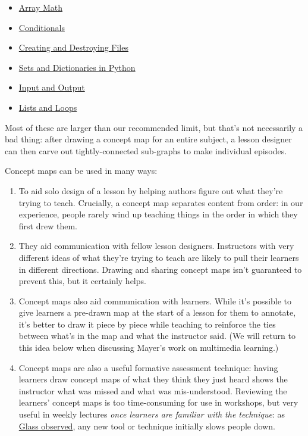 \begin{itemize}
\item
  \href{fig/array-math.png}{Array Math}
\item
  \href{fig/conditionals.png}{Conditionals}
\item
  \href{fig/create-destroy.png}{Creating and Destroying Files}
\item
  \href{fig/dict-set.png}{Sets and Dictionaries in Python}
\item
  \href{fig/io.png}{Input and Output}
\item
  \href{fig/lists-loops.png}{Lists and Loops}
\end{itemize}

Most of these are larger than our recommended limit, but that's not
necessarily a bad thing: after drawing a concept map for an entire
subject, a lesson designer can then carve out tightly-connected
sub-graphs to make individual episodes.

Concept maps can be used in many ways:

\begin{enumerate}
\item
  To aid solo design of a lesson by helping authors figure out what
  they're trying to teach. Crucially, a concept map separates content
  from order: in our experience, people rarely wind up teaching things
  in the order in which they first drew them.
\item
  They aid communication with fellow lesson designers. Instructors with
  very different ideas of what they're trying to teach are likely to
  pull their learners in different directions. Drawing and sharing
  concept maps isn't guaranteed to prevent this, but it certainly helps.
\item
  Concept maps also aid communication with learners. While it's possible
  to give learners a pre-drawn map at the start of a lesson for them to
  annotate, it's better to draw it piece by piece while teaching to
  reinforce the ties between what's in the map and what the instructor
  said. (We will return to this idea below when discussing Mayer's work
  on multimedia learning.)
\item
  Concept maps are also a useful formative assessment technique: having
  learners draw concept maps of what they think they just heard shows
  the instructor what was missed and what was mis-understood. Reviewing
  the learners' concept maps is too time-consuming for use in workshops,
  but very useful in weekly lectures \emph{once learners are familiar
  with the technique}: as
  \href{http://www.amazon.com/Facts-Fallacies-Software-Engineering-Robert/dp/0321117425/}{Glass
  observed}, any new tool or technique initially slows people down.
\end{enumerate}

